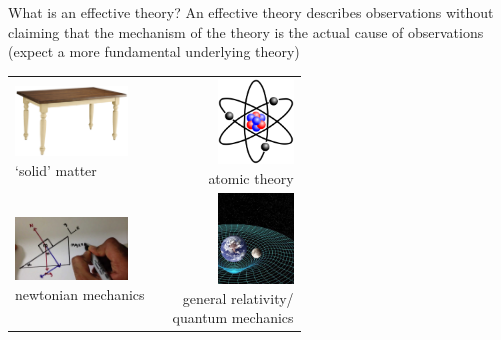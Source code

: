 \documentclass[professionalfont,fleqn]{beamer}
\begin{document}
\begin{frame}{What is an effective theory?}
  \centering
  An effective theory describes observations without claiming that the mechanism of the theory is the actual cause of observations (expect a more fundamental underlying theory)
  \begin{tabular}{lC{2.5cm}r}
    \parbox[c]{3cm}{\centering\includegraphics[width=3cm]{figures/table}\\`solid' matter} &
      \begin{tikzpicture}
        \node[single arrow,fill=blue,minimum height=10mm,minimum width=10mm] {};
      \end{tikzpicture} &
    \parbox[c]{4cm}{\centering\includegraphics[width=2cm]{figures/atom}\\atomic theory} \\
    \parbox[c]{3cm}{\centering\includegraphics[width=3cm]{figures/newtonian}\\newtonian mechanics} &
      \begin{tikzpicture}
        \node[single arrow,fill=blue,minimum height=10mm,minimum width=10mm] {};
      \end{tikzpicture} &
    \parbox[c]{4cm}{\centering\includegraphics[width=2cm]{figures/relativity}\\general relativity/\\quantum mechanics} \\
  \end{tabular}
\end{frame}
\end{document}
